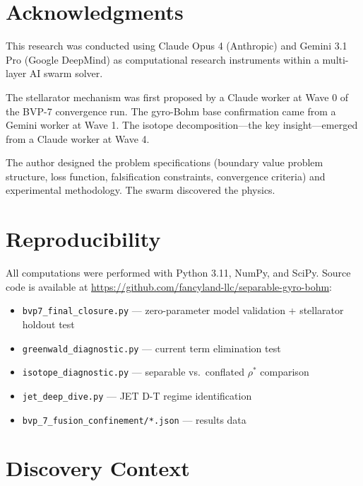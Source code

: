 \documentclass[11pt,letterpaper]{article}
\newcommand{\rhostar}{\rho^*}
\begin{document}
\section*{Acknowledgments}

This research was conducted using Claude Opus 4 (Anthropic) and Gemini 3.1 Pro (Google DeepMind) as computational research instruments within a multi-layer AI swarm solver.

The stellarator mechanism was first proposed by a Claude worker at Wave 0 of the BVP-7 convergence run. The gyro-Bohm base confirmation came from a Gemini worker at Wave 1. The isotope decomposition---the key insight---emerged from a Claude worker at Wave 4.

The author designed the problem specifications (boundary value problem structure, loss function, falsification constraints, convergence criteria) and experimental methodology. The swarm discovered the physics.

\appendix
\section{Reproducibility}

All computations were performed with Python 3.11, NumPy, and SciPy. Source code is available at \url{https://github.com/fancyland-llc/separable-gyro-bohm}:

\begin{itemize}[noitemsep]
\item \texttt{bvp7\_final\_closure.py} --- zero-parameter model validation + stellarator holdout test
\item \texttt{greenwald\_diagnostic.py} --- current term elimination test
\item \texttt{isotope\_diagnostic.py} --- separable vs.\ conflated $\rhostar$ comparison
\item \texttt{jet\_deep\_dive.py} --- JET D-T regime identification
\item \texttt{bvp\_7\_fusion\_confinement/*.json} --- results data
\end{itemize}

\section{Discovery Context}
\end{document}
